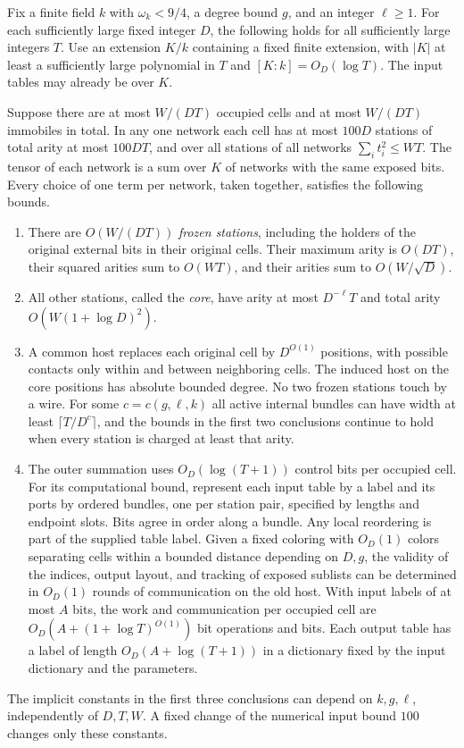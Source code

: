 \begin{lemma}\label{lem:local}
Fix a finite field \(k\) with \(\omega_k<9/4\), a degree bound \(g\), and
an integer \(\ell\ge1\). For each sufficiently large fixed integer \(D\),
the following holds for all sufficiently large integers \(T\). Use an
extension \(K/k\) containing a fixed finite extension, with \(|K|\) at
least a sufficiently large polynomial in \(T\) and
\([K:k]=O_D(\log T)\). The input tables may already be over \(K\).

Suppose there are at most \(W/(DT)\) occupied cells and at most
\(W/(DT)\) immobiles in total. In any one network each cell has at most \(100D\) stations
of total arity at most \(100DT\), and over all stations of all networks
\(\sum_i t_i^2\le WT\). The tensor of each network is a sum over \(K\)
of networks with the same exposed bits. Every choice of one term per network, taken together, satisfies the following bounds.
\begin{enumerate}
\item There are \(O(W/(DT))\) \emph{frozen stations}, including the
holders of the original external bits in their original cells. Their
maximum arity is \(O(DT)\), their squared arities sum to \(O(WT)\),
and their arities sum to \(O(W/\sqrt D)\).
\item All other stations, called the \emph{core}, have arity at most
\(D^{-\ell}T\) and total arity \(O(W(1+\log D)^2)\).
\item A common host replaces each original cell by \(D^{O(1)}\) positions,
with possible contacts only within and between neighboring cells. The
induced host on the core positions has absolute bounded degree.
No two frozen stations touch by a wire. For some \(c=c(g,\ell,k)\) all active
internal bundles can have width at least \(\lceil T/D^c\rceil\), and
the bounds in the first two conclusions continue to hold when every
station is charged at least that arity.
\item The outer summation uses \(O_D(\log(T+1))\) control bits per
occupied cell. For its computational bound, represent each input table
by a label and its ports by ordered bundles, one per station pair,
specified by lengths and endpoint slots. Bits agree in order along a
bundle. Any local reordering is part of the supplied table label.
Given a fixed coloring with \(O_D(1)\) colors separating cells
within a bounded distance depending on \(D,g\), the validity of the indices, output
layout, and tracking of exposed sublists can be determined in \(O_D(1)\)
rounds of communication on the old host. With input labels of at most
\(A\) bits, the work and communication per occupied cell are
\(O_D(A+(1+\log T)^{O(1)})\) bit operations and bits. Each output table
has a label of length \(O_D(A+\log(T+1))\) in a dictionary fixed by the
input dictionary and the parameters.
\end{enumerate}
The implicit constants in the first three conclusions can depend on
\(k,g,\ell\), independently of \(D,T,W\). A fixed change of the numerical
input bound \(100\) changes only these constants.
\end{lemma}


